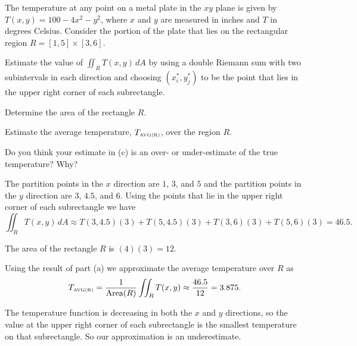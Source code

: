 \begin{exercises} 

\item The temperature at any point on a metal plate in the $xy$ plane is given by $T(x,y) = 100-4x^2 - y^2$, where $x$ and $y$ are measured in inches and $T$ in degrees Celsius.  Consider the portion of the plate that lies on the rectangular region $R = [1,5] \times [3,6]$.

\ba
	\item Estimate the value of $\iint_R T(x,y) \, dA$ by using a double Riemann sum with two subintervals in each direction and choosing $(x_i^*, y_j^*)$ to be the point that lies in the upper right corner of each subrectangle.  
	\item Determine the area of the rectangle $R$.
	\item Estimate the average temperature, $T_{\mbox{\tiny{AVG}(R)}}$, over the region $R$.
	\item Do you think your estimate in (c) is an over- or under-estimate of the true temperature?  Why?
\ea

\begin{exerciseSolution}
\ba
	\item The partition points in the $x$ direction are $1$, $3$, and $5$ and the partition points in the $y$ direction are $3$, $4.5$, and $6$. Using the points that lie in the upper right corner of each subrectangle we have
\[\iint_R T(x,y) \, dA \approx T(3,4.5)(3) + T(5,4.5)(3) + T(3,6)(3) + T(5,6)(3) = 46.5.\]

	\item The area of the rectangle $R$ is $(4)(3) = 12$. 

	\item Using the result of part (a) we approximate the average temperature over $R$ as 
\[T_{\mbox{\tiny{AVG}(R)}} = \frac{1}{\text{Area}(R)} \iint_R T(x,y) \approx \frac{46.5}{12} = 3.875.\]

	\item The temperature function is decreasing in both the $x$ and $y$ directions, so the value at the upper right corner of each subrectangle is the smallest temperature on that subrectangle. So our approximation is an underestimate. 
\ea
\end{exerciseSolution}


\end{exercises}
